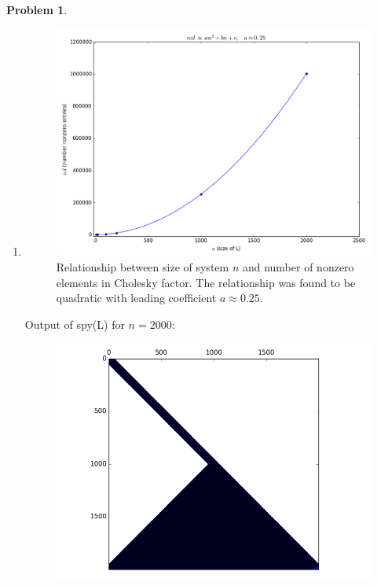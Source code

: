 \documentclass[10pt]{article}
\theoremstyle{definition}
\newtheorem{prob}{Problem}
\begin{document}
\begin{prob}
\begin{enumerate}[\bfseries(a)]
\begin{lstlisting}
          if sparse.issparse(G): 
              nzl = G.count_nonzero() 
          else: 
              nzl = np.count_nonzero(G) 
              
          return G, nzl 
          \end{lstlisting}

          The following suggested sanity check was performed, which yielded the desired result:
    \begin{verbatim}  
In [1]: cholesky(np.array([[2,1,0],[1,2,1],[0,1,2]],dtype='f'))
Out[1]: 
(array([[ 1.41421354,  0.        ,  0.        ],
        [ 0.70710677,  1.2247448 ,  0.        ],
        [ 0.        ,  0.81649655,  1.15470064]], dtype=float32), 5)
    \end{verbatim}

\item
    \begin{figure}
        \includegraphics[width=\linewidth]{hw4_1b.png}
        \caption{Relationship between size of system $n$ and number of nonzero elements in Cholesky factor.
        The relationship was found to be quadratic with leading coefficient $a \approx 0.25$.}
    \end{figure}
    Output of spy(L) for $n=2000$:
    \begin{figure}
    \includegraphics[width=\linewidth]{hw4_spy.png}

\end{figure}
\end{enumerate}
\end{prob}
\end{document}
